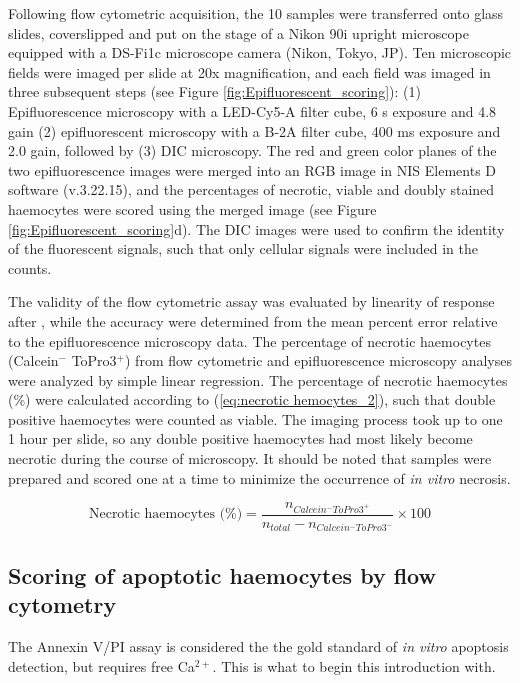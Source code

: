 Following flow cytometric acquisition, the 10 samples were transferred onto glass slides, coverslipped and put on the stage of a Nikon 90i upright microscope equipped with a DS-Fi1c microscope camera (Nikon, Tokyo, JP). Ten microscopic fields were imaged per slide at 20x magnification, and each field was imaged in three subsequent steps (see Figure \ref{fig:Epifluorescent_scoring}): (1) Epifluorescence microscopy with a LED-Cy5-A filter cube, 6 s exposure and 4.8 gain (2) epifluorescent microscopy with a B-2A filter cube, 400 ms exposure and 2.0 gain, followed by (3) DIC microscopy. The red and green color planes of the two epifluorescence images were merged into an RGB image in NIS Elements D software (v.3.22.15), and the percentages of necrotic, viable and doubly stained haemocytes were scored using the merged image (see Figure \ref{fig:Epifluorescent_scoring}d). The DIC images were used to confirm the identity of the fluorescent signals, such that only cellular signals were included in the counts.

The validity of the flow cytometric assay was evaluated by linearity of response after \cite{Ericson2021}, while the accuracy were determined from the mean percent error relative to the epifluorescence microscopy data. The percentage of necrotic haemocytes (Calcein$^{-}$ ToPro3$^{+}$) from flow cytometric and epifluorescence microscopy analyses were analyzed by simple linear regression. The percentage of necrotic haemocytes (\%) were calculated according to (\ref{eq:necrotic hemocytes_2}), such that double positive haemocytes were counted as viable. The imaging process took up to one 1 hour per slide, so any double positive haemocytes had most likely become necrotic during the course of microscopy. It should be noted that samples were prepared and scored one at a time to minimize the occurrence of \emph{in vitro} necrosis.

\begin{equation}
    \label{eq:necrotic hemocytes_2}
    \text{Necrotic haemocytes (\%)} = \dfrac{n_{Calcein^{-}ToPro3^{+}}}{n_{total} - n_{Calcein^{-}ToPro3^{-}}} \times 100
\end{equation}


\subsection{Scoring of apoptotic haemocytes by flow cytometry}
The Annexin V/PI assay is considered the the gold standard of \emph{in vitro} apoptosis detection, but requires free Ca$^{2+}$. This is what to begin this introduction with.
